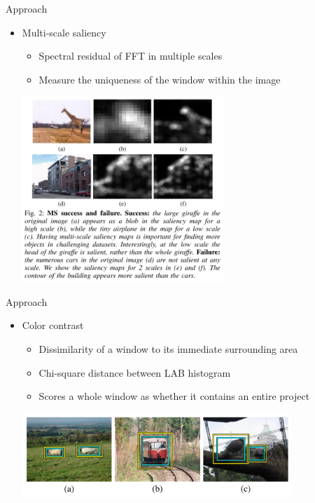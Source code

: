 \documentclass[12pt]{beamer}
\begin{document}
\begin{frame}{Approach}
    \begin{itemize}
        \item Multi-scale saliency
        \begin{itemize}
            \item Spectral residual of FFT in multiple scales
            \item Measure the uniqueness of the window within the image
        \end{itemize}
        \medskip
        { \includegraphics[width=0.6\textwidth]{fig2.png} } 
    \end{itemize}
\end{frame}

\begin{frame}{Approach}
    \begin{itemize}
        \item Color contrast
        \begin{itemize}
            \item Dissimilarity of a window to its immediate surrounding area
            \item Chi-square distance between LAB histogram
            \item Scores a whole window as whether it contains an entire project
        \end{itemize}
        \medskip
        { \includegraphics[width=0.8\textwidth]{fig3.png} } 
    \end{itemize}
\end{frame}
\end{document}
